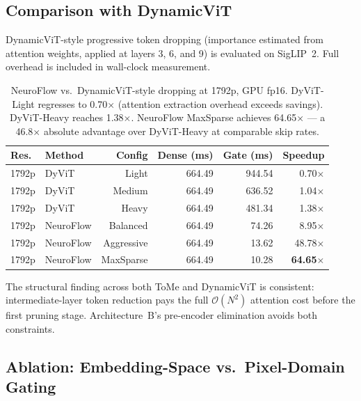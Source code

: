 \documentclass{article}
\begin{document}
\subsection{Comparison with DynamicViT}
\label{sec:comparison_dynamicvit}

DynamicViT-style progressive token dropping (importance estimated from
attention weights, applied at layers 3, 6, and 9) is evaluated on
SigLIP~2. Full overhead is included in wall-clock measurement.

\begin{table}[htbp]
\centering
\setlength{\tabcolsep}{4pt}
\renewcommand{\arraystretch}{1.05}
\begin{tabular}{llrrrr}
\toprule
\textbf{Res.} & \textbf{Method} & \textbf{Config} & \textbf{Dense (ms)} & \textbf{Gate (ms)} & \textbf{Speedup} \\
\midrule
1792p & DyViT & Light  & 664.49 &  944.54 & 0.70$\times$ \\
1792p & DyViT & Medium & 664.49 &  636.52 & 1.04$\times$ \\
1792p & DyViT & Heavy  & 664.49 &  481.34 & 1.38$\times$ \\
\midrule
1792p & NeuroFlow & Balanced   & 664.49 &  74.26 &  8.95$\times$ \\
1792p & NeuroFlow & Aggressive & 664.49 &  13.62 & 48.78$\times$ \\
1792p & NeuroFlow & MaxSparse  & 664.49 &  10.28 & \textbf{64.65}$\times$ \\
\bottomrule
\end{tabular}
\caption{NeuroFlow vs.\ DynamicViT-style dropping at 1792p, GPU fp16.
DyViT-Light regresses to 0.70$\times$ (attention extraction overhead
exceeds savings). DyViT-Heavy reaches 1.38$\times$. NeuroFlow MaxSparse
achieves 64.65$\times$ — a 46.8$\times$ absolute advantage over
DyViT-Heavy at comparable skip rates.}
\label{tab:dynamicvit-comparison}
\end{table}

The structural finding across both ToMe and DynamicViT is consistent:
intermediate-layer token reduction pays the full $\mathcal{O}(N^2)$
attention cost before the first pruning stage. Architecture~B's
pre-encoder elimination avoids both constraints.

\subsection{Ablation: Embedding-Space vs.\ Pixel-Domain Gating}
\label{sec:ablation_gating_signal}
\end{document}

